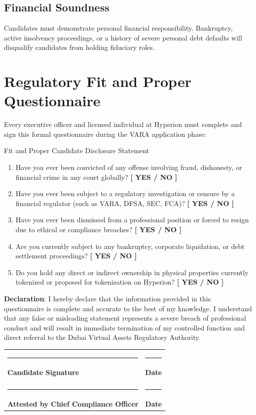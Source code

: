 \documentclass[11pt]{article}
\begin{document}
\subsection{Financial Soundness}
Candidates must demonstrate personal financial responsibility. Bankruptcy, active insolvency proceedings, or a history of severe personal debt defaults will disqualify candidates from holding fiduciary roles.

\section{Regulatory Fit and Proper Questionnaire}
Every executive officer and licensed individual at Hyperion must complete and sign this formal questionnaire during the VARA application phase:

\begin{alertbox}{Fit and Proper Candidate Disclosure Statement}
\selectfont\fontsize{9}{11}\selectfont
\begin{enumerate}
    \item Have you ever been convicted of any offense involving fraud, dishonesty, or financial crime in any court globally? \quad \textbf{[ YES / NO ]}
    \item Have you ever been subject to a regulatory investigation or censure by a financial regulator (such as VARA, DFSA, SEC, FCA)? \quad \textbf{[ YES / NO ]}
    \item Have you ever been dismissed from a professional position or forced to resign due to ethical or compliance breaches? \quad \textbf{[ YES / NO ]}
    \item Are you currently subject to any bankruptcy, corporate liquidation, or debt settlement proceedings? \quad \textbf{[ YES / NO ]}
    \item Do you hold any direct or indirect ownership in physical properties currently tokenized or proposed for tokenization on Hyperion? \quad \textbf{[ YES / NO ]}
\end{enumerate}
\end{alertbox}

\noindent
\textbf{Declaration}: I hereby declare that the information provided in this questionnaire is complete and accurate to the best of my knowledge. I understand that any false or misleading statement represents a severe breach of professional conduct and will result in immediate termination of my controlled function and direct referral to the Dubai Virtual Assets Regulatory Authority.

\par\vspace{1.5cm}
\noindent
\begin{tabularx}{\textwidth}{X X}
    \rule{4cm}{0.4pt} & \rule{4cm}{0.4pt} \\
    \textbf{Candidate Signature} & \textbf{Date} \\
    & \\
    \rule{4cm}{0.4pt} & \rule{4cm}{0.4pt} \\
    \textbf{Attested by Chief Compliance Officer} & \textbf{Date}
\end{tabularx}

\makehyperionseal
\end{document}

